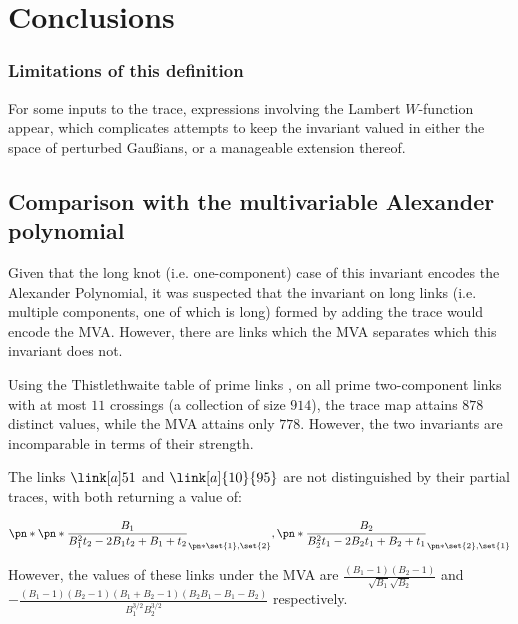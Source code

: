 \chapter{Conclusions}\label{ch:conclusions}

\subsection{Limitations of this definition}\label{sec:limitations}
For some inputs to the trace, expressions involving the Lambert $W$-function
appear, which complicates attempts to keep the invariant valued in either the
space of perturbed Gaußians, or a manageable extension thereof.

\section{Comparison with the multivariable Alexander polynomial}
\label{sec:compare_MVA}

Given that the long knot (i.e. one-component) case of this invariant
encodes the Alexander Polynomial, it was suspected that the invariant on long
links (i.e. multiple components, one of which is long) formed by adding the
trace would encode the \ac{MVA}. However, there are links which the \ac{MVA}
separates which this invariant does not.

Using the Thistlethwaite table of prime links \cite{knotatlas}, on all prime
two-component links with at most $11$ crossings (a collection of size $914$),
the trace map attains $878$ distinct values, while the MVA attains only $778$.
However, the two invariants are incomparable in terms of their strength.

The links $\link[a]51$ and $\link[a]{10}{95}$ are not distinguished by their
partial traces, with both returning a value of:

\begin{equation}
        \pn*{
                \pn*{
                        \frac{B_1}{B_1^2 t_2 -2 B_1 t_2 +B_1+t_2}
                }_{\pn*{\set{1},\set{2}}},
                \pn*{
                        \frac{B_2}{B_2^2 t_1 -2 B_2 t_1 +B_2+t_1}
                }_{\pn*{\set{2},\set{1}}}
}
\end{equation}

However, the values of these links under the \ac{MVA} are
$\frac{\left(B_1-1\right) \left(B_2-1\right)}{\sqrt{B_1} \sqrt{B_2}}
$ and $-\frac{\left(B_1-1\right) \left(B_2-1\right) \left(B_1+B_2-1\right)
        \left(B_2 B_1-B_1-B_2\right)}{B_1^{3/2} B_2^{3/2}}$ respectively.

